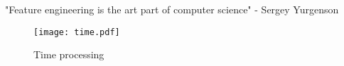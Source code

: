 \begin{displayquote}
    \begin{em}
        "Feature engineering is the art part of computer science" - Sergey Yurgenson
    \end{em}
\end{displayquote}




\begin{figure}
    \centering
    \texttt{[image: time.pdf]}
    \caption{Time processing}
    \label{fig:unixtime}
\end{figure}





